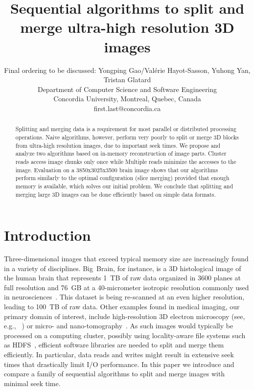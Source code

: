 \documentclass[10pt, conference, compsocconf]{IEEEtran}
\newcommand{\todo}[1]{\marginpar{\parbox{18mm}{\flushleft\tiny\color{red}\textbf{TODO}:
      #1}}}
\begin{document}
\title{Sequential algorithms to split and merge ultra-high resolution 3D images}

\author{Final ordering
  to be discussed: Yongping Gao/Val\'erie Hayot-Sasson,
  Yuhong Yan, Tristan Glatard\\
  Department of Computer Science and Software Engineering\\ Concordia University, Montreal, Quebec, Canada\\
  {first.last}@concordia.ca
}

\maketitle

\begin{abstract}
  Splitting and merging data is a requirement for most parallel or
  distributed processing operations. Naive algorithms, however,
  perform very poorly to split or merge 3D blocks from ultra-high
  resolution images, due to important seek times. We propose and
  analyze two algorithms based on in-memory reconstruction of image
  parts. Cluster reads access image chunks only once while Multiple
  reads minimize the accesses to the image. Evaluation on a
  3850x3025x3500 brain image shows that our algorithms perform
  similarly to the optimal configuration (slice merging) provided that
  enough memory is available, which solves our initial problem.  We
  conclude that splitting and merging large 3D images can be done
  efficiently based on simple data formats.
\end{abstract}


\section{Introduction}

Three-dimensional images that exceed typical memory size are
increasingly found in a variety of disciplines. Big~Brain, for
\todo{summarize sizes} instance, is a 3D histological image of the human brain that
represents 1~TB of raw data organized in 3600 planes at full resolution
and 76~GB at a 40-micrometer isotropic resolution
commonly used in neurosciences~\cite{amunts2013bigbrain}. This dataset
is being re-scanned at an even higher resolution, leading to 100~TB of
raw data. Other examples found in medical imaging, our primary domain
of interest, include high-resolution 3D electron microscopy (see,
e.g., ~\cite{bock2011network}) or micro- and
nano-tomography~\cite{10.1371/journal.pone.0035691}. As such images
would typically be processed on a computing cluster, possibly using
locality-aware file systems such as HDFS~\cite{shvachko2010hadoop},
efficient software libraries are needed to split and merge them
efficiently. In particular, data reads and writes might result in
extensive seek times that drastically limit I/O performance.  In this
paper we introduce and compare a family of sequential algorithms to
split and merge images with minimal seek time.
\end{document}
